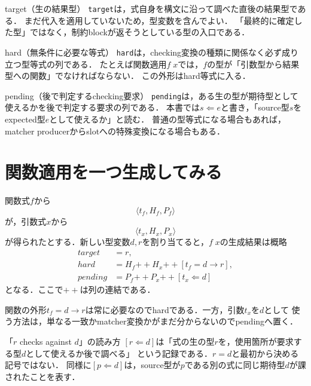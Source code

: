 \documentclass[11pt,a4paper,oneside]{ltjsbook}
\newcommand{\code}[1]{\texttt{#1}}
\newcommand{\checks}{\mathrel{\Leftarrow}}
\newcommand{\fn}{\mathbin{\to}}
\begin{document}
\begin{definitionbox}{target（生の結果型）}
\code{target}は，式自身を構文に沿って調べた直後の結果型である．
まだ代入を適用していないため，型変数を含んでよい．
「最終的に確定した型」ではなく，制約blockが返そうとしている型の入口である．
\end{definitionbox}

\begin{definitionbox}{hard（無条件に必要な等式）}
\code{hard}は，checking変換の種類に関係なく必ず成り立つ型等式の列である．
たとえば関数適用$f\;x$では，$f$の型が「引数型から結果型への関数」でなければならない．
この外形はhard等式に入る．
\end{definitionbox}

\begin{definitionbox}{pending（後で判定するchecking要求）}
\code{pending}は，ある生の型が期待型として使えるかを後で判定する要求の列である．
本書では$s\checks e$と書き，「source型$s$をexpected型$e$として使えるか」と読む．
普通の型等式になる場合もあれば，matcher producerからslotへの特殊変換になる場合もある．
\end{definitionbox}

\section{関数適用を一つ生成してみる}

関数式$f$から
\[
  \langle t_f,H_f,P_f\rangle
\]
が，引数式$x$から
\[
  \langle t_x,H_x,P_x\rangle
\]
が得られたとする．新しい型変数$d,r$を割り当てると，$f\;x$の生成結果は概略
\[
\begin{aligned}
  \mathit{target}  &= r,\\
  \mathit{hard}    &= H_f \mathbin{+\!+} H_x
                       \mathbin{+\!+} [t_f = d\fn r],\\
  \mathit{pending} &= P_f \mathbin{+\!+} P_x
                       \mathbin{+\!+} [t_x\checks d]
\end{aligned}
\]
となる．ここで$+\!+$は列の連結である．

関数の外形$t_f=d\fn r$は常に必要なのでhardである．一方，引数$t_x$を$d$として
使う方法は，単なる一致かmatcher変換かがまだ分からないのでpendingへ置く．

\begin{pointbox}{「$r$ checks against $d$」の読み方}
$[r\checks d]$は「式の生の型$r$を，使用箇所が要求する型$d$として使えるか後で調べる」
という記録である．$r=d$と最初から決める記号ではない．
同様に$[p\checks d]$は，source型が$p$である別の式に同じ期待型$d$が課されたことを表す．
\end{pointbox}
\end{document}

